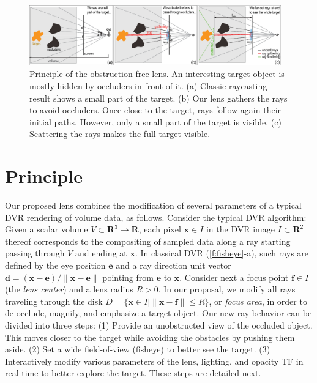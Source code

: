 \begin{figure}[htbp]
\centering
\vspace{-0.15cm}
\includegraphics [width=0.97\textwidth]{images/principle.eps}
\vspace{-0.15cm}
\caption{Principle of the obstruction-free lens. An interesting target object is mostly hidden by occluders in front of it. (a) Classic raycasting result shows a small part of the target. (b) Our lens gathers the rays to avoid occluders. Once close to the target, rays follow again their initial paths. However, only a small part of the target is visible. (c) Scattering the rays makes the full target visible.}
\label{f:fisheye}
\vspace{-0.15cm}
\end{figure}

\vspace{-0.15cm}
\section{Principle}
\label{sec:principle}
%
%
Our proposed lens combines the modification of several parameters of a typical DVR rendering of volume data, as follows. Consider the typical DVR algorithm: Given a scalar volume $V \subset \mathbf{R}^3 \rightarrow \mathbf{R}$, each pixel $\mathbf{x} \in I$ in the DVR image $I \subset \mathbf{R}^2$ thereof corresponds to the compositing of sampled data along a ray starting passing through $V$ and ending at $\mathbf{x}$. In classical DVR (\autoref{f:fisheye}-a), such rays are defined by the eye position $\mathbf{e}$ and a ray direction unit vector $\mathbf{d} = (\mathbf{x} - \mathbf{e}) / \| \mathbf{x} - \mathbf{e} \|$ pointing from $\mathbf{e}$ to $\mathbf{x}$. Consider next a focus point $\mathbf{f} \in I$ (the \emph{lens center}) and a lens radius $R > 0$. In our proposal, we modify all rays traveling through the disk $D = \{\mathbf{x} \in I | \| \mathbf{x} - \mathbf{f} \| \leq R\}$, or \emph{focus area}, in order to de-occlude, magnify, and emphasize a target object. Our new ray behavior can be divided into three steps: (1) Provide an unobstructed view of the occluded object. This moves closer to the target while avoiding the obstacles by pushing them aside. (2) Set a wide field-of-view (fisheye) to better see the target. (3) Interactively modify various parameters of the lens, lighting, and opacity TF in real time to better explore the target. These steps are detailed next.

